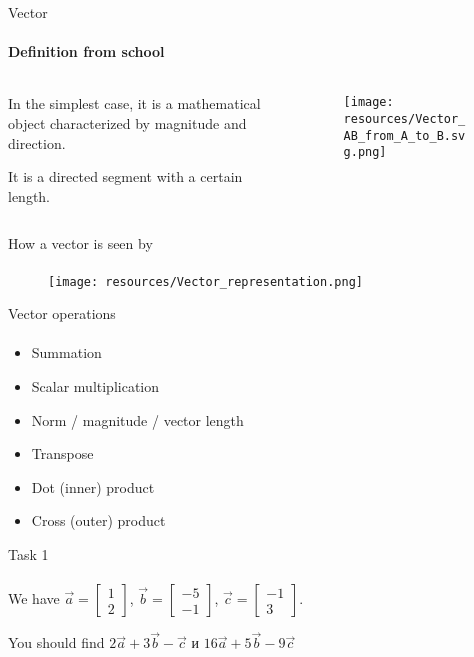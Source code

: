 \documentclass[aspectratio=169,notes]{beamer}
\begin{document}
\begin{frame}[t]{Vector}
    \framesubtitle{Definition from school}
    \begin{columns}[T,onlytextwidth]
        \begin{column}{0.49\textwidth}
            In the simplest case, it is a mathematical object characterized by magnitude and direction.

            It is a directed segment with a certain length.
        \end{column}
        \begin{column}{0.49\textwidth}
            \begin{figure}[H]
                \centering\texttt{[image: resources/Vector\_AB\_from\_A\_to\_B.svg.png]}
                \label{fig:resources/Vector_AB_from_A_to_B.svg.png}
            \end{figure}
        \end{column}
    \end{columns}
\end{frame}

\begin{frame}[t]{How a vector is seen by}
    \framesubtitle{}
    \vspace{-0.6cm}
    \begin{figure}[H]
        \centering\texttt{[image: resources/Vector\_representation.png]}
        \label{fig:file_name}
    \end{figure}
\end{frame}

\begin{frame}[t]{Vector operations}
    \framesubtitle{}
    \begin{itemize}
        \item Summation
        \item Scalar multiplication
        \item Norm / magnitude / vector length
        \item Transpose
        \item Dot (inner) product
        \item Cross (outer) product
    \end{itemize}
\end{frame}

\begin{frame}[t]{Task 1}
    \framesubtitle{}
    We have $\vec{a} = \begin{bmatrix}
            1 \\ 2
        \end{bmatrix}$, $\vec{b} = \begin{bmatrix}
            -5 \\ -1
        \end{bmatrix}$, $\vec{c} = \begin{bmatrix}
            -1 \\ 3
        \end{bmatrix}$.
    \medskip

    You should find $2\vec{a} + 3\vec{b} - \vec{c}$ и $16\vec{a} + 5\vec{b} - 9\vec{c}$
\end{frame}
\end{document}
